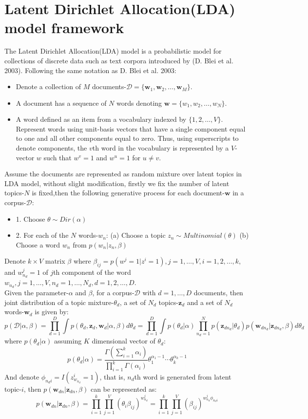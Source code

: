 \documentclass[a4paper]{article}
\newcommand{\bi}{\begin{itemize}}
\newcommand{\ei}{\end{itemize}}
\newcommand{\bs}{\boldsymbol}
\newcommand{\Prod}{\displaystyle\prod}
\begin{document}
\section{Latent Dirichlet Allocation(LDA) model framework}
The Latent Dirichlet Allocation(LDA) model is a probabilistic model for collections of discrete data such as text corpora introduced by (D. Blei et al. 2003). Following the same notation as D. Blei et al. 2003:\\
\bi
\item Denote a collection of $M$ documents-$\mathcal{D}=\{\bs{w}_1,\bs{w}_2,\ldots,\bs{w}_M\}$.
\item A document has a sequence of $N$ words denoting $\bs{w}=\{w_1,w_2,\ldots,w_N\}$.
\item A word defined as an item from a vocabulary indexed by $\{1,2,\ldots,V\}$. Represent words using unit-basis vectors that have a single component equal to
one and all other components equal to zero. Thus, using superscripts to denote components, the $v$th word in the vocabulary is represented by a $V$-vector $w$ such that $w^v = 1$ and $w^u=1$ for
$u\neq v$.
\ei
Assume the documents are represented as random mixture over latent topics in LDA model, without slight modification, firstly we fix the number of latent topics-$N$ is fixed,then the following generative process for each document-$\bs{w}$ in a corpus-$\mathcal{D}$:\\
\bi
\item[1.] Choose $\theta\sim Dir(\alpha)$
\item[2.] For each of the $N$ words-$w_n$:
\subitem(a) Choose a topic $z_n\sim Multinomial(\theta)$
\subitem(b) Choose a word $w_n$ from $p(w_n|z_n,\beta)$
\ei
Denote $k\times V$ matrix $\beta$ where $\beta_{ij}=p(w^j=1|z^i=1),j=1,\ldots,V,i=1,2,\ldots,k$, and $w_{n_d}^j=1$ of $j$th component of the word $w_{n_d},j=1,\ldots,V,n_d=1,\ldots,N_d,d=1,2,\ldots,D$.
\\
Given the parameter-$\alpha$ and $\beta$, for a corpus-$\mathcal{D}$ with  $d=1,\ldots,D$ documents,
then joint distribution of a topic mixture-$\theta_d$, a set of $N_d$ topics-$\bs{z}_d$ and a set of $N_d$ words-$\bs{w}_d$ is given by:
\[
p(\mathcal{D}|\alpha,\beta)=\Prod_{d=1}^{D}\int p(\theta_d,\bs{z}_d,\bs{w}_d|\alpha,\beta)d\theta_d=\Prod_{d=1}^{D}\int p(\theta_d|\alpha)\Prod_{n_d=1}^{N}p(\bs{z}_{dn_d}|\theta_d)p(\bs{w}_{dn_d}|\bs{z}_{dn_d},\beta)d\theta_d
\]
where $p(\theta_d|\alpha)$ assuming $K$ dimensional vector of $\theta_d$:\\
\[
p(\theta_d|\alpha)=\frac{\Gamma(\sum_{i=1}^{k}\alpha_i)}{\prod_{i=1}^{k}\Gamma(\alpha_i)}\theta_1^{\alpha_1-1}\cdots\theta_k^{\alpha_k-1}
\]
And denote $\phi_{n_di}=I(z_{w_{n_d}}^i=1)$, that is, $n_d$th word is generated from latent topic-$i$, then $p(\bs{w}_{dn}|\bs{z}_{dn},\beta)$ can be represented as:\\
\[
p(\bs{w}_{dn}|\bs{z}_{dn},\beta)=\Prod_{i=1}^{k}\Prod_{j=1}^{V}(\theta_{i}\beta_{ij})^{w_{n_d}^{j}}=\Prod_{i=1}^{k}\Prod_{j=1}^{V}(\beta_{ij})^{w_{n_d}^{j}\phi_{n_di}}
\]
\end{document}
